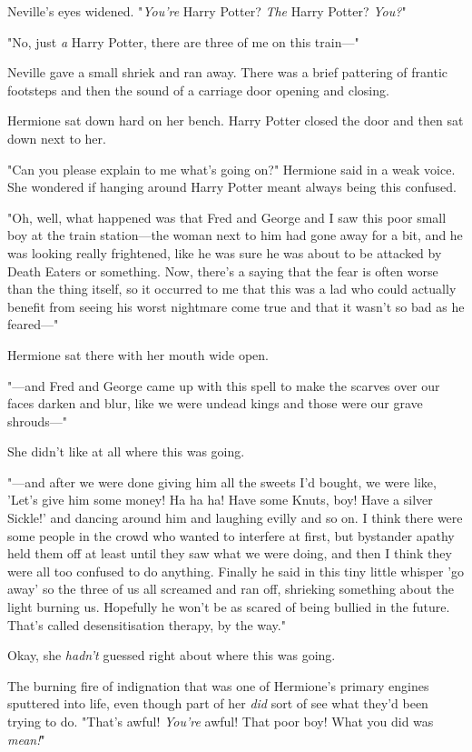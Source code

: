 Neville's eyes widened. "\emph{You're} Harry Potter? \emph{The} Harry Potter? 
\emph{You?}"

"No, just \emph{a} Harry Potter, there are three of me on this train---"

Neville gave a small shriek and ran away. There was a brief pattering of 
frantic footsteps and then the sound of a carriage door opening and closing.

Hermione sat down hard on her bench. Harry Potter closed the door and then sat 
down next to her.

"Can you please explain to me what's going on?" Hermione said in a weak voice. 
She wondered if hanging around Harry Potter meant always being this confused.

"Oh, well, what happened was that Fred and George and I saw this poor small boy 
at the train station---the woman next to him had gone away for a bit, and he 
was looking really frightened, like he was sure he was about to be attacked by 
Death Eaters or something. Now, there's a saying that the fear is often worse 
than the thing itself, so it occurred to me that this was a lad who could 
actually benefit from seeing his worst nightmare come true and that it wasn't 
so bad as he feared---"

Hermione sat there with her mouth wide open.

"---and Fred and George came up with this spell to make the scarves over our 
faces darken and blur, like we were undead kings and those were our grave 
shrouds---"

She didn't like at all where this was going.

"---and after we were done giving him all the sweets I'd bought, we were like, 
'Let's give him some money! Ha ha ha! Have some Knuts, boy! Have a silver 
Sickle!' and dancing around him and laughing evilly and so on. I think there 
were some people in the crowd who wanted to interfere at first, but bystander 
apathy held them off at least until they saw what we were doing, and then I 
think they were all too confused to do anything. Finally he said in this tiny 
little whisper 'go away' so the three of us all screamed and ran off, shrieking 
something about the light burning us. Hopefully he won't be as scared of being 
bullied in the future. That's called desensitisation therapy, by the way."

Okay, she \emph{hadn't} guessed right about where this was going.

The burning fire of indignation that was one of Hermione's primary engines 
sputtered into life, even though part of her \emph{did} sort of see what they'd 
been trying to do. "That's awful! \emph{You're} awful! That poor boy! What you 
did was \emph{mean!}"

